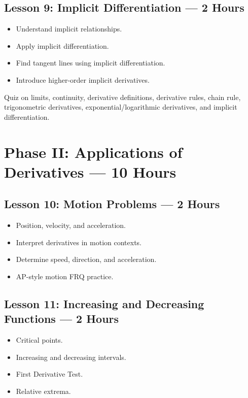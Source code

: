 \documentclass[11pt]{article}
\newcommand{\circnum}[1]{%
\tikz[baseline=(char.base)]{
\node[shape=circle, draw=NovelPurple, text=NovelPurple, line width=0.8pt, inner sep=1.6pt] (char) {\small #1};
}}
\begin{document}
\subsection*{\circnum{9} Lesson 9: Implicit Differentiation --- 2 Hours}
\begin{itemize}
    \item Understand implicit relationships.
    \item Apply implicit differentiation.
    \item Find tangent lines using implicit differentiation.
    \item Introduce higher-order implicit derivatives.
\end{itemize}

\begin{tcolorbox}[colback=SoftGray, colframe=NovelPurple, title=\textbf{Checkpoint 1}]
Quiz on limits, continuity, derivative definitions, derivative rules, chain rule, trigonometric derivatives, exponential/logarithmic derivatives, and implicit differentiation.
\end{tcolorbox}

\section*{Phase II: Applications of Derivatives --- 10 Hours}

\subsection*{\circnum{10} Lesson 10: Motion Problems --- 2 Hours}
\begin{itemize}
    \item Position, velocity, and acceleration.
    \item Interpret derivatives in motion contexts.
    \item Determine speed, direction, and acceleration.
    \item AP-style motion FRQ practice.
\end{itemize}

\subsection*{\circnum{11} Lesson 11: Increasing and Decreasing Functions --- 2 Hours}
\begin{itemize}
    \item Critical points.
    \item Increasing and decreasing intervals.
    \item First Derivative Test.
    \item Relative extrema.
\end{itemize}
\end{document}
